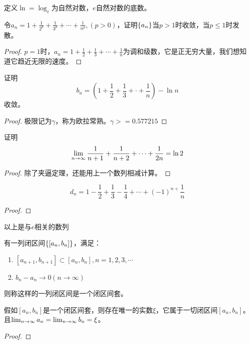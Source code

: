 定义$\ln = \log_e$为自然对数，$e$自然对数的底数。

\begin{proposition}
    令$a_n = 1 + \frac{1}{2^p} + \frac{1}{3^p} + \cdots + \frac{1}{n^p}, (p > 0)$，证明$\left\{ a_n\right\}$当$p>1$时收敛，当$p \le 1$时发散。    
\end{proposition}
\begin{proof}

$p = 1$时，$a_n = 1 + \frac{1}{2} +\frac{1}{3} + \cdots + \frac{1}{n}$为调和级数，它是正无穷大量，我们想知道它趋近无限的速度。
\end{proof}

\begin{proposition}
证明
    \[ b_n = \left( 1 +\frac{1}{2} + \frac{1}{3} + \cdot + \frac{1}{n} \right) - \ln n \]
    收敛。
\end{proposition}
\begin{proof}
    极限记为$\gamma$，称为欧拉常熟。$\gamma >= 0.577215$
\end{proof}

\begin{proposition}
证明
\[ \lim_{n \to \infty } \frac{1}{n+1} + \frac{1}{n+2} + \cdots + \frac{1}{2n} = \ln 2\]
\end{proposition}
\begin{proof}
除了夹逼定理，还能用上一个数列相减计算。
\end{proof}

\begin{proposition}
\[ d_n = 1- \frac{1}{2} + \frac{1}{3} - \frac{1}{4} + \cdots +(-1)^{n+}\frac{1}{n} \]
\end{proposition}
\begin{proof}

\end{proof}
以上是与$e$相关的数列

\begin{definition}[闭区间套]
    有一列闭区间$\left\{ \left[a_n, b_n \right]\right\}$，满足：
    \begin{enumerate}
        \item $\left[ a_{n+1}, b_{n+1}\right] \subset \left[ a_n, b_n\right], n = 1, 2, 3, \cdots $
        \item $b_n - a_n \to 0(n \to \infty)$
    \end{enumerate}
    则称这样的一列闭区间是一个闭区间套。
\end{definition}
\begin{theorem}[闭区间套定理]
    假如$\left[ a_n, b_n\right]$是一个闭区间套，则存在唯一的实数$\xi$，它属于一切闭区间$\left[ a_n, b_n\right]$。且$\lim_{n \to \infty } a_n = \lim_{n \to \infty } b_n = \xi$。
\end{theorem}
\begin{proof}
\end{proof}

